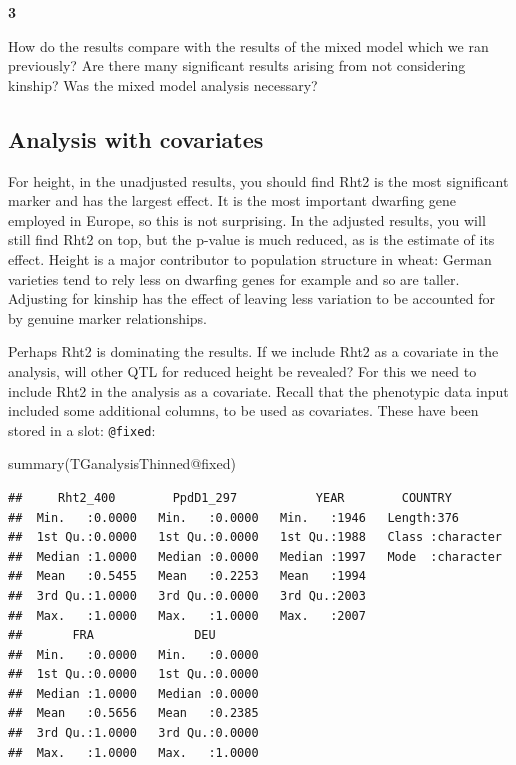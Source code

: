 \documentclass[
]{book}
\makeatletter
\newenvironment{Shaded}{\begin{snugshade}}{\end{snugshade}}
\newcommand{\FunctionTok}[1]{\textcolor[rgb]{0.00,0.00,0.00}{#1}}
\newcommand{\NormalTok}[1]{#1}
\newcommand{\SpecialCharTok}[1]{\textcolor[rgb]{0.00,0.00,0.00}{#1}}
\newenvironment{kframe}{%
\medskip{}
\setlength{\fboxsep}{.8em}
 \def\at@end@of@kframe{}%
 \ifinner\ifhmode%
  \def\at@end@of@kframe{\end{minipage}}%
  \begin{minipage}{\columnwidth}%
 \fi\fi%
 \def\FrameCommand##1{\hskip\@totalleftmargin \hskip-\fboxsep
 \colorbox{shadecolor}{##1}\hskip-\fboxsep
     \hskip-\linewidth \hskip-\@totalleftmargin \hskip\columnwidth}%
 \MakeFramed {\advance\hsize-\width
   \@totalleftmargin\z@ \linewidth\hsize
   \@setminipage}}%
 {\par\unskip\endMakeFramed%
 \at@end@of@kframe}
\newenvironment{rmdblock}[1]
  {
  \begin{itemize}
  \renewcommand{\labelitemi}{
    \raisebox{-.7\height}[0pt][0pt]{
      {\setkeys{Gin}{width=3em,keepaspectratio}\texttt{[image: images/\#1]}}
    }
  }
  \setlength{\fboxsep}{1em}
  \begin{kframe}
  \item
  }
  {
  \end{kframe}
  \end{itemize}
  }
\newenvironment{rmdquiz}
  {\begin{rmdblock}{quiz}}
  {\end{rmdblock}}
\makeatother
\begin{document}
\begin{rmdquiz}
\textbf{3}

How do the results compare with the results of the mixed model which we ran previously? Are there many significant results arising from not considering kinship? Was the mixed model analysis necessary?
\end{rmdquiz}

\hypertarget{analysis-with-covariates}{%
\subsection{Analysis with covariates}\label{analysis-with-covariates}}

For height, in the unadjusted results, you should find Rht2 is the most significant marker and has the largest effect. It is the most important dwarfing gene employed in Europe, so this is not surprising. In the adjusted results, you will still find Rht2 on top, but the p-value is much reduced, as is the estimate of its effect. Height is a major contributor to population structure in wheat: German varieties tend to rely less on dwarfing genes for example and so are taller. Adjusting for kinship has the effect of leaving less variation to be accounted for by genuine marker relationships.

Perhaps Rht2 is dominating the results. If we include Rht2 as a covariate in the analysis, will other QTL for reduced height be revealed? For this we need to include Rht2 in the analysis as a covariate. Recall that the phenotypic data input included some additional columns, to be used as covariates. These have been stored in a slot: \texttt{@fixed}:

\begin{Shaded}
\begin{Highlighting}[]
\FunctionTok{summary}\NormalTok{(TGanalysisThinned}\SpecialCharTok{@}\NormalTok{fixed)}
\end{Highlighting}
\end{Shaded}

\begin{verbatim}
##     Rht2_400        PpdD1_297           YEAR        COUNTRY         
##  Min.   :0.0000   Min.   :0.0000   Min.   :1946   Length:376        
##  1st Qu.:0.0000   1st Qu.:0.0000   1st Qu.:1988   Class :character  
##  Median :1.0000   Median :0.0000   Median :1997   Mode  :character  
##  Mean   :0.5455   Mean   :0.2253   Mean   :1994                     
##  3rd Qu.:1.0000   3rd Qu.:0.0000   3rd Qu.:2003                     
##  Max.   :1.0000   Max.   :1.0000   Max.   :2007                     
##       FRA              DEU        
##  Min.   :0.0000   Min.   :0.0000  
##  1st Qu.:0.0000   1st Qu.:0.0000  
##  Median :1.0000   Median :0.0000  
##  Mean   :0.5656   Mean   :0.2385  
##  3rd Qu.:1.0000   3rd Qu.:0.0000  
##  Max.   :1.0000   Max.   :1.0000
\end{verbatim}
\end{document}
